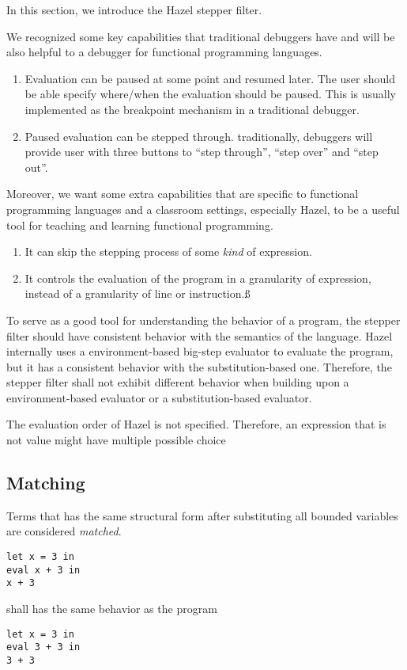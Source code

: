 In this section, we introduce the Hazel stepper filter.

We recognized some key capabilities that traditional debuggers have and will be
also helpful to a debugger for functional programming languages.
\begin{enumerate}
  \item Evaluation can be paused at some point and resumed later. The user
    should be able specify where/when the evaluation should be paused. This is
    usually implemented as the breakpoint mechanism in a traditional debugger.
  \item Paused evaluation can be stepped through. traditionally, debuggers will
    provide user with three buttons to ``step through'', ``step over'' and
    ``step out''.
\end{enumerate}

Moreover, we want some extra capabilities that are specific to functional
programming languages and a classroom settings, especially Hazel, to be a
useful tool for teaching and learning functional programming.
\begin{enumerate}
  \item It can skip the stepping process of some \emph{kind} of expression.
  \item It controls the evaluation of the program in a granularity of
  expression, instead of a granularity of line or instruction.ß
\end{enumerate}

To serve as a good tool for understanding the behavior of a program, the stepper
filter should have consistent behavior with the semantics of the language. Hazel
internally uses a environment-based big-step evaluator to evaluate the program,
but it has a consistent behavior with the substitution-based one. Therefore,
the stepper filter shall not exhibit different behavior when building upon a
environment-based evaluator or a substitution-based evaluator.

The evaluation order of Hazel is not specified. Therefore, an expression that is
not value might have multiple possible choice 

\subsection{Matching}


Terms that has the same structural form after substituting all bounded variables
are considered \emph{matched}.

\begin{verbatim}
let x = 3 in
eval x + 3 in
x + 3
\end{verbatim}
shall has the same behavior as the program
\begin{verbatim}
let x = 3 in
eval 3 + 3 in
3 + 3
\end{verbatim}

